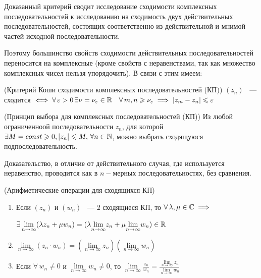 \documentclass[../../main.tex]{subfiles}
\begin{document}
\begin{rem}
	Доказанный критерий сводит исследование сходимости комплексных
	 последовательностей к исследованию на сходимость двух действительных
	 последовательностей, состоящих соответственно из действительной и мнимой
	 частей исходной последовательности.
	
	Поэтому большинство свойств сходимости действительных последовательностей 
	 переносится на комплексные (кроме свойств с неравенствами, так как множество
	 комплексных чисел нельзя упорядочить). В связи с этим имеем:
	
	\begin{thm}(Критерий Коши сходимости комплексных последовательностей (КП))
		$ (z_n) $ ~---  сходится $ \iff \forall\, \varepsilon > 0\, \exists \nu = \nu_\varepsilon \in \mathbb{R} \quad \forall\, m, n \geqslant \nu_\varepsilon \implies |z_m - z_n| \leqslant \varepsilon $
	\end{thm} 

	\begin{thm}(Принцип выбора для комплексных последовательностей (КП))		
		Из любой ограниченноой последовательности $ z_n $, для которой $ \exists M = const \geqslant 0, |z_n| \leqslant M,\, \forall n \in \mathbb{N} $, можно выбрать сходящуюся подпоследовательность.
		
		Доказательство, в отличие от действительного случая, где используется неравенство, проводится как в $ n-\text{мерных} $ последовательностях, без сравнения.
	\end{thm}

	\begin{thm}(Арифметические операции для сходящихся КП)
		\begin{enumerate}
			\item Если $ (z_n) $ и $ (w_n) $ ~--- 2 сходящиеся КП, то $ \forall\, \lambda, \mu \in \mathbb{C} \implies $
			
			$ \exists\, \underset{n \to \infty}{\lim} (\lambda z_n + \mu w_n) = (\lambda \underset{n \to \infty}{\lim}z_n + \mu \underset{n \to \infty}{\lim}w_n) \in \mathbb{R} $
			
			\item $ \underset{n \to \infty}{\lim} (z_n \cdot w_n) = (\underset{n \to \infty}{\lim} z_n)(\underset{n \to \infty}{\lim} w_n) $
			
			\item Если $ \forall\, w_n \neq 0 $ и $ \underset{n \to \infty}{\lim} w_n \neq 0 $, то $ \underset{n \to \infty}{\lim} \frac{z_n}{w_n} = \frac{\underset{n \to \infty}{\lim} z_n}{\underset{n \to \infty}{\lim} w_n} $
		\end{enumerate}
	\end{thm}
\end{rem}
\end{document}
